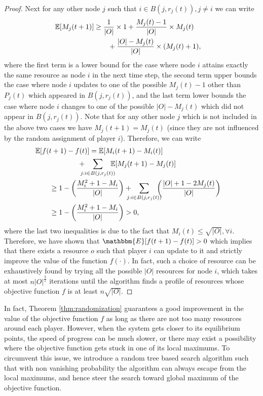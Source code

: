 \documentclass[conference, 10pt, twocolumn]{ieeeconf}
\begin{document}
\begin{proof}
Next for any other node $j$ such that $i\in B(j, r_j(t)), j\neq i$ we can write
\begin{align}\nonumber
\mathbb{E}[M_j(t+1)]&\ge \frac{1}{|O|}\times 1+\frac{M_j(t)-1}{|O|}\times M_j(t)\cr 
&\qquad+\frac{|O|-M_j(t)}{|O|}\times (M_j(t)+1),
\end{align}
where the first term is a lower bound for the case where node $i$ attains exactly the same resource as node $i$ in the next time step, the second term upper bounds the case where node $i$ updates to one of the possible $M_j(t)-1$ other than $P_j(t)$ which appeared in $B(j, r_j(t))$, and the last term lower bounds the case where node $i$ changes to one of the possible $|O|-M_j(t)$ which did not appear in $B(j, r_j(t))$. Note that for any other node $j$ which is not included in the above two cases we have $M_j(t+1)=M_j(t)$ (since they are not influenced by the random assignment of player $i$). Therefore, we can write
\begin{align}\nonumber
&\mathbb{E}[f(t+1)-f(t)]=\mathbb{E}[M_i(t+1)-M_i(t)]\cr 
&\qquad\qquad\qquad+\!\!\!\!\!\sum_{j: i\in B(j, r_j(t))}\!\!\!\!\!\mathbb{E}[M_j(t+1)-M_j(t)]\cr 
&\qquad\ge 1-\left(\frac{M_i^2+1-M_i}{|O|}\right)+\!\!\!\!\!\sum_{j: i\in B(j, r_j(t))}\!\!\!\!\!\left(\frac{|O|+1-2M_j(t)}{|O|}\right)\cr 
&\qquad\ge 1-\left(\frac{M_i^2+1-M_i}{|O|}\right) >0,
\end{align}
where the last two inequalities is due to the fact that $M_i(t)\leq \sqrt{|O|}, \forall i$. Therefore, we have shown that $\mathbbm{E}[f(t+1)-f(t)]>0$ which implies that there exists a resource $o$ such that player $i$ can update to it and strictly improve the value of the function $f(\cdot)$. In fact, such a choice of resource can be exhaustively found by trying all the possible $|O|$ resources for node $i$, which takes at most $n|O|^{\frac{3}{2}}$ iterations until the algorithm finds a profile of resources whose objective function $f$ is at least $n\sqrt{|O|}$.
\end{proof}

In fact, Theorem \ref{thm:randomization} guarantees a good improvement in the value of the objective function $f$ as long as there are not too many resources around each player. However, when the system gets closer to its equilibrium points, the speed of progress can be much slower, or there may exist a possibility where the objective function gets stuck in one of its local maximums. To circumvent this issue, we introduce a random tree based search algorithm such that with non vanishing probability the algorithm can always escape from the local maximums, and hence steer the search toward global maximum of the objective function.  
\end{document}
